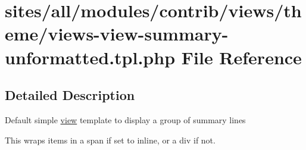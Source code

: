 \hypertarget{views-view-summary-unformatted_8tpl_8php}{
\section{sites/all/modules/contrib/views/theme/views-view-summary-unformatted.tpl.php File Reference}
\label{views-view-summary-unformatted_8tpl_8php}
}


\subsection{Detailed Description}
Default simple \hyperlink{classview}{view} template to display a group of summary lines

This wraps items in a span if set to inline, or a div if not. 